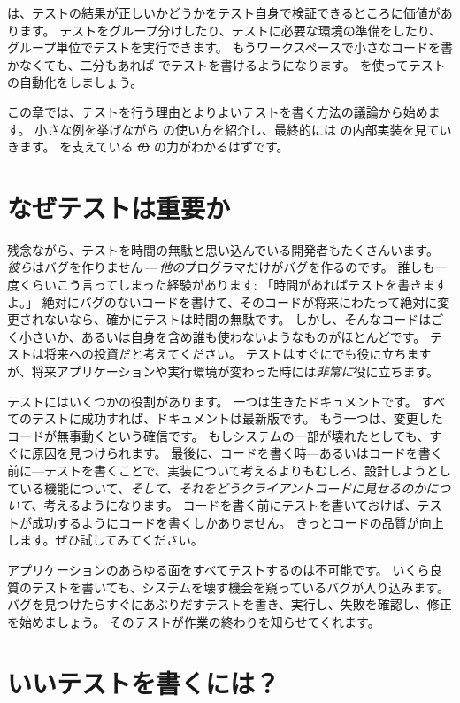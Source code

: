 \documentclass[a4paper,10pt,twoside]{book}
\begin{document}
\sunit は、テストの結果が正しいかどうかをテスト自身で検証できるところに価値があります。
テストをグループ分けしたり、テストに必要な環境の準備をしたり、グループ単位でテストを実行できます。
もうワークスペースで小さなコードを書かなくても、二分もあれば \sunit でテストを書けるようになります。
\sunit を使ってテストの自動化をしましょう。

この章では、テストを行う理由とよりよいテストを書く方法の議論から始めます。
小さな例を挙げながら \sunit の使い方を紹介し、最終的には \sunit の内部実装を見ていきます。
\sunit を支えている \st の  の力がわかるはずです。

\section{なぜテストは重要か}

残念ながら、テストを時間の無駄と思い込んでいる開発者もたくさんいます。
\emph{彼ら}はバグを作りません\,---\,\emph{他の}プログラマだけがバグを作るのです。
誰しも一度くらいこう言ってしまった経験があります: 「時間があればテストを書きますよ。」
絶対にバグのないコードを書けて、そのコードが将来にわたって絶対に変更されないなら、確かにテストは時間の無駄です。
しかし、そんなコードはごく小さいか、あるいは自身を含め誰も使わないようなものがほとんどです。
テストは将来への投資だと考えてください。
テストはすぐにでも役に立ちますが、将来アプリケーションや実行環境が変わった時には\emph{非常に}役に立ちます。

テストにはいくつかの役割があります。
一つは生きたドキュメントです。
すべてのテストに成功すれば、ドキュメントは最新版です。
もう一つは、変更したコードが無事動くという確信です。
もしシステムの一部が壊れたとしても、すぐに原因を見つけられます。
最後に、コードを書く時---あるいはコードを書く前に---テストを書くことで、実装について考えるよりもむしろ、設計しようとしている機能について、\emph{そして、それをどうクライアントコードに見せるのかについて}、考えるようになります。
コードを書く前にテストを書いておけば、テストが成功するようにコードを書くしかありません。
きっとコードの品質が向上します。ぜひ試してみてください。

アプリケーションのあらゆる面をすべてテストするのは不可能です。
いくら良質のテストを書いても、システムを壊す機会を窺っているバグが入り込みます。
バグを見つけたらすぐにあぶりだすテストを書き、実行し、失敗を確認し、修正を始めましょう。
そのテストが作業の終わりを知らせてくれます。

\section{いいテストを書くには？}
\end{document}
